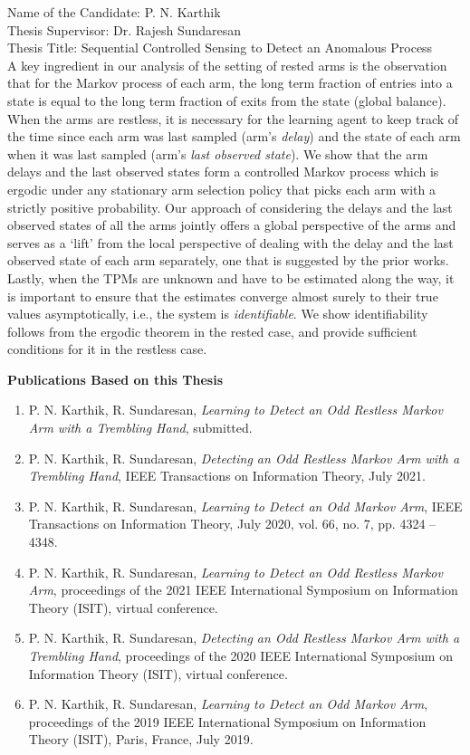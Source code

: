 \documentclass[11pt]{letter} %
\begin{document}
\begin{letter}{Name of the Candidate: P. N. Karthik\\
Thesis Supervisor: Dr. Rajesh Sundaresan\\
Thesis Title: Sequential Controlled Sensing to Detect an Anomalous Process\\
}
A key ingredient in our analysis of the setting of rested arms is the observation that for the Markov process of each arm, the long term fraction of entries into a state is equal to the long term fraction of exits from the state (global balance). When the arms are restless, it is necessary for the learning agent to keep track of the time since each arm was last sampled (arm's {\em delay}) and the state of each arm when it was last sampled (arm's {\em last observed state}). We show that the arm delays and the last observed states form a controlled Markov process which is ergodic under any stationary arm selection policy that picks each arm with a strictly positive probability. Our approach of considering the delays and the last observed states of all the arms jointly offers a global perspective of the arms and serves as a `lift' from the local perspective of dealing with the delay and the last observed state of each arm separately, one that is suggested by the prior works. Lastly, when the TPMs are unknown and have to be estimated along the way, it is important to ensure that the estimates converge almost surely to their true values asymptotically, i.e., the system is {\em identifiable}. We show identifiability follows from the ergodic theorem in the rested case, and provide sufficient conditions for it in the restless case.

\vspace{1cm}
\textbf{Publications Based on this Thesis}
\begin{enumerate}
	\item P. N. Karthik, R. Sundaresan, {\em Learning to Detect an Odd Restless Markov Arm with a Trembling Hand}, submitted.
	\item P. N. Karthik, R. Sundaresan, {\em Detecting an Odd Restless Markov Arm with a Trembling Hand}, IEEE Transactions on Information Theory, July 2021.
	\item P. N. Karthik, R. Sundaresan, {\em Learning to Detect an Odd Markov Arm}, IEEE Transactions on Information Theory, July 2020, vol. 66, no. 7, pp. 4324 – 4348.
	\item P. N. Karthik, R. Sundaresan, {\em Learning to Detect an Odd Restless Markov Arm},  
proceedings of the 2021 IEEE International Symposium on Information Theory (ISIT), virtual conference.
	\item P. N. Karthik, R. Sundaresan, {\em Detecting an Odd Restless Markov Arm with a Trembling Hand}, proceedings of the 2020 IEEE International Symposium on Information Theory (ISIT), virtual conference.
	\item P. N. Karthik, R. Sundaresan, {\em Learning to Detect an Odd Markov Arm}, proceedings of the 2019 IEEE International Symposium on Information Theory (ISIT), Paris, France, July 2019.
\end{enumerate}

\end{letter}
\end{document}
